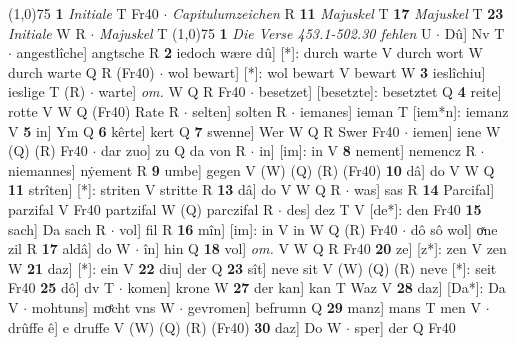 \documentclass[8pt,a4paper,notitlepage]{article}
\begin{document}
\begin{table}[ht]
\begin{minipage}[t]{0.5\linewidth}
\line(1,0){75} \newline
\textbf{1} \textit{Initiale} T Fr40   $\cdot$ \textit{Capitulumzeichen} R  \textbf{11} \textit{Majuskel} T  \textbf{17} \textit{Majuskel} T  \textbf{23} \textit{Initiale} W R   $\cdot$ \textit{Majuskel} T  \newline
\line(1,0){75} \newline
\textbf{1} \textit{Die Verse 453.1-502.30 fehlen} U   $\cdot$ Dû] Nv T  $\cdot$ angestlîche] angtsche R \textbf{2} iedoch wære dû] [*]: durch warte V durch wort W durch warte Q R (Fr40)  $\cdot$ wol bewart] [*]: wol bewart V bewart W \textbf{3} ieslîchiu] ieslige T (R)  $\cdot$ warte] \textit{om.} W Q R Fr40  $\cdot$ besetzet] [besetzte]: besetztet Q \textbf{4} reite] rotte V W Q (Fr40) Rate R  $\cdot$ selten] solten R  $\cdot$ iemanes] ieman T [iem*n]: iemanz V \textbf{5} in] Ym Q \textbf{6} kêrte] kert Q \textbf{7} swenne] Wer W Q R Swer Fr40  $\cdot$ iemen] iene W (Q) (R) Fr40  $\cdot$ dar zuo] zu Q da von R  $\cdot$ in] [im]: in V \textbf{8} nement] nemencz R  $\cdot$ niemannes] nẏement R \textbf{9} umbe] gegen V (W) (Q) (R) (Fr40) \textbf{10} dâ] do V W Q \textbf{11} strîten] [*]: striten V stritte R \textbf{13} dâ] do V W Q R  $\cdot$ was] sas R \textbf{14} Parcifal] parzifal V Fr40 partzifal W (Q) parczifal R  $\cdot$ des] dez T V [de*]: den Fr40 \textbf{15} sach] Da sach R  $\cdot$ vol] fil R \textbf{16} mîn] [im]: in V in W Q (R) Fr40  $\cdot$ dô sô wol] oͯne zil R \textbf{17} aldâ] do W  $\cdot$ în] hin Q \textbf{18} vol] \textit{om.} V W Q R Fr40 \textbf{20} ze] [z*]: zen V zen W \textbf{21} daz] [*]: ein V \textbf{22} diu] der Q \textbf{23} sît] neve sit V (W) (Q) (R) neve [*]: seit  Fr40 \textbf{25} dô] dv T  $\cdot$ komen] krone W \textbf{27} der kan] kan T Waz V \textbf{28} daz] [Da*]: Da V  $\cdot$ mohtuns] moͤcht vns W  $\cdot$ gevromen] befrumn Q \textbf{29} manz] mans T men V  $\cdot$ drûffe ê] e druffe V (W) (Q) (R) (Fr40) \textbf{30} daz] Do W  $\cdot$ sper] der Q Fr40 \newline
\end{minipage}
\end{table}
\end{document}
